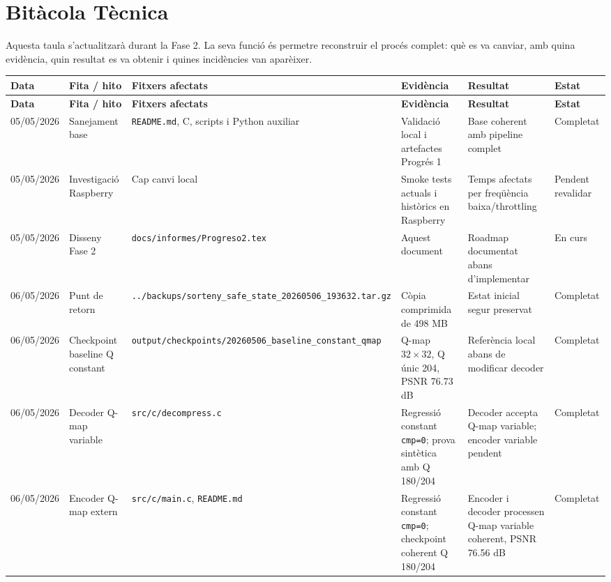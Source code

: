 \documentclass[11pt,a4paper]{article}
\begin{document}
\section{Bitàcola Tècnica}

Aquesta taula s'actualitzarà durant la Fase 2. La seva funció és permetre reconstruir el procés complet: què es va canviar, amb quina evidència, quin resultat es va obtenir i quines incidències van aparèixer.

\begin{longtable}{p{1.7cm} p{2.3cm} p{2.6cm} p{2.8cm} p{2.1cm} p{2.0cm}}
\toprule
\textbf{Data} & \textbf{Fita / hito} & \textbf{Fitxers afectats} & \textbf{Evidència} & \textbf{Resultat} & \textbf{Estat} \\
\midrule
\endfirsthead
\toprule
\textbf{Data} & \textbf{Fita / hito} & \textbf{Fitxers afectats} & \textbf{Evidència} & \textbf{Resultat} & \textbf{Estat} \\
\midrule
\endhead
05/05/2026 & Sanejament base & \texttt{README.md}, C, scripts i Python auxiliar & Validació local i artefactes Progrés 1 & Base coherent amb pipeline complet & Completat \\
05/05/2026 & Investigació Raspberry & Cap canvi local & Smoke tests actuals i històrics en Raspberry & Temps afectats per freqüència baixa/throttling & Pendent revalidar \\
05/05/2026 & Disseny Fase 2 & \texttt{docs/informes/Progreso2.tex} & Aquest document & Roadmap documentat abans d'implementar & En curs \\
06/05/2026 & Punt de retorn & \texttt{../backups/sorteny\_safe\_state\_20260506\_193632.tar.gz} & Còpia comprimida de 498 MB & Estat inicial segur preservat & Completat \\
06/05/2026 & Checkpoint baseline Q constant & \texttt{output/checkpoints/20260506\_baseline\_constant\_qmap} & Q-map $32 \times 32$, Q únic 204, PSNR 76.73 dB & Referència local abans de modificar decoder & Completat \\
06/05/2026 & Decoder Q-map variable & \texttt{src/c/decompress.c} & Regressió constant \texttt{cmp=0}; prova sintètica amb Q 180/204 & Decoder accepta Q-map variable; encoder variable pendent & Completat \\
06/05/2026 & Encoder Q-map extern & \texttt{src/c/main.c}, \texttt{README.md} & Regressió constant \texttt{cmp=0}; checkpoint coherent Q 180/204 & Encoder i decoder processen Q-map variable coherent, PSNR 76.56 dB & Completat \\

\end{longtable}
\end{document}
